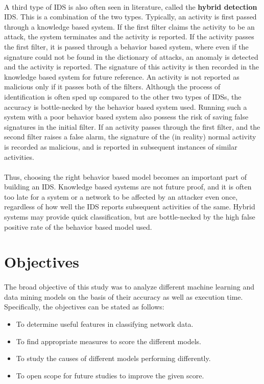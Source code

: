 \paragraph{}
A third type of IDS is also often seen in literature, called the \textbf{hybrid detection} IDS. This is a combination of the two types. Typically, an activity is first passed through a knowledge based system. If the first filter claims the activity to be an attack, the system terminates and the activity is reported. If the activity passes the first filter, it is passed through a behavior based system, where even if the signature could not be found in the dictionary of attacks, an anomaly is detected and the activity is reported. The signature of this activity is then recorded in the knowledge based system for future reference. An activity is not reported as malicious only if it passes both of the filters. Although the process of identification is often sped up compared to the other two types of IDSs, the accuracy is bottle-necked by the behavior based system used. Running such a system with a poor behavior based system also possess the risk of saving false signatures in the initial filter. If an activity passes through the first filter, and the second filter raises a false alarm, the signature of the (in reality) normal activity is recorded as malicious, and is reported in subsequent instances of similar activities.

\paragraph{}
Thus, choosing the right behavior based model becomes an important part of building an IDS. Knowledge based systems are not future proof, and it is often too late for a system or a network to be affected by an attacker even once, regardless of how well the IDS reports subsequent activities of the same. Hybrid systems may provide quick classification, but are bottle-necked by the high false positive rate of the behavior based model used.

\section{Objectives}

\paragraph{}
The broad objective of this study was to analyze different machine learning and data mining models on the basis of their accuracy as well as execution time.\\
Specifically, the objectives can be stated as follows:
\begin{itemize}
    \item To determine useful features in classifying network data.
    \item To find appropriate measures to score the different models.
    \item To study the causes of different models performing differently.
    \item To open scope for future studies to improve the given score.
\end{itemize}

